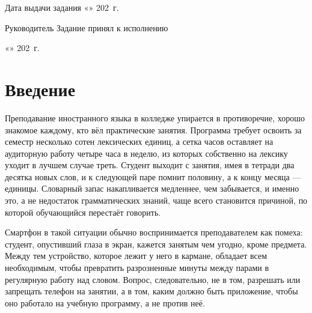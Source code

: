 \documentclass[11pt,a4paper,openany]{report}
\begin{document}
\vspace{12pt}
\noindent Дата выдачи задания «\underline{\hspace{1cm}}» \underline{\hspace{3.2cm}} 202\underline{\hspace{0.4cm}}~г.

\vspace{16pt}
\noindent Руководитель \underline{\hspace{4.2cm}}\hfill Задание принял к исполнению \underline{\hspace{4.2cm}}

\vspace{1pt}

\vspace{12pt}
\noindent «\underline{\hspace{1cm}}» \underline{\hspace{3.2cm}} 202\underline{\hspace{0.4cm}}~г.
\endgroup

\clearpage

\tableofcontents
\clearpage

\setcounter{page}{4}

\chapter*{Введение}

Преподавание иностранного языка в колледже упирается в противоречие, хорошо знакомое каждому, кто вёл практические занятия. Программа требует освоить за семестр несколько сотен лексических единиц, а сетка часов оставляет на аудиторную работу четыре часа в неделю, из которых собственно на лексику уходит в лучшем случае треть. Студент выходит с занятия, имея в тетради два десятка новых слов, и к следующей паре помнит половину, а к концу месяца — единицы. Словарный запас накапливается медленнее, чем забывается, и именно это, а не недостаток грамматических знаний, чаще всего становится причиной, по которой обучающийся перестаёт говорить.

Смартфон в такой ситуации обычно воспринимается преподавателем как помеха: студент, опустивший глаза в экран, кажется занятым чем угодно, кроме предмета. Между тем устройство, которое лежит у него в кармане, обладает всем необходимым, чтобы превратить разрозненные минуты между парами в регулярную работу над словом. Вопрос, следовательно, не в том, разрешать или запрещать телефон на занятии, а в том, каким должно быть приложение, чтобы оно работало на учебную программу, а не против неё.
\end{document}

